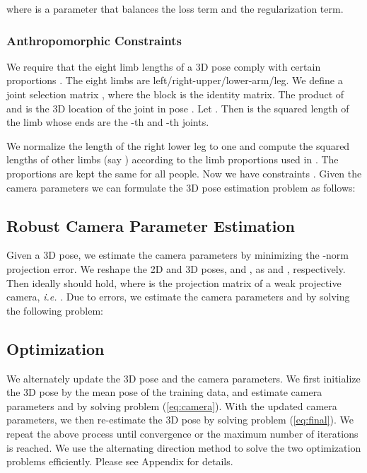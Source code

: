 \documentclass[10pt,twocolumn,letterpaper]{article}
\begin{document}
where  is a parameter that balances the loss term and
the regularization term.


\subsubsection{Anthropomorphic Constraints}
We require that the eight limb lengths of a 3D pose comply with
certain proportions \cite{c14}. The eight limbs are
left/right-upper/lower-arm/leg. We define a joint selection matrix , where the  block is
the identity matrix. The product of  and  is the 3D
location of the  joint in pose . Let
. Then  is the
squared length of the  limb whose ends are the -th
and -th joints.

We normalize the length of the right lower leg to one and compute
the squared lengths of other limbs (say ) according to the limb
proportions used in \cite{c14}. The proportions are kept the same for all
people. Now we have constraints . Given the camera parameters we can
formulate the 3D pose estimation problem as follows:


\subsection{Robust Camera Parameter Estimation}
\label{sec:camera_sec} Given a 3D pose, we estimate the camera
parameters by minimizing the -norm projection error. We
reshape the 2D and 3D poses,  and , as  and , respectively. Then
ideally  should hold, where  is the projection matrix of a weak
projective camera, {\em i.e.} . Due to errors, we estimate the camera parameters  and  by solving the
following problem:


\subsection{Optimization}
We alternately update the 3D pose and the camera parameters. We
first initialize the 3D pose  by the mean pose of the
training data, and estimate camera parameters  and  by
solving problem (\ref{eq:camera}). With the updated camera
parameters, we then re-estimate the 3D pose by solving problem
(\ref{eq:final}). We repeat the above process until convergence or
the maximum number of iterations is reached. We use the
alternating direction method to solve the two optimization
problems efficiently. Please see Appendix for details.
\end{document}
